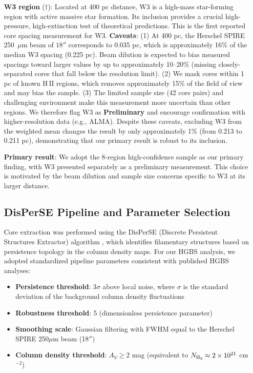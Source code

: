 \documentclass[11pt,a4paper]{article}
\begin{document}
\noindent\textbf{W3 region} ($\dagger$): Located at 400 pc distance, W3 is a high-mass star-forming region with active massive star formation. Its inclusion provides a crucial high-pressure, high-extinction test of theoretical predictions. This is the first reported core spacing measurement for W3. \textbf{Caveats}: (1) At 400 pc, the Herschel SPIRE 250~$\mu$m beam of $18''$ corresponds to 0.035 pc, which is approximately 16\% of the median W3 spacing (0.225 pc). Beam dilution is expected to bias measured spacings toward larger values by up to approximately 10--20\% (missing closely-separated cores that fall below the resolution limit). (2) We mask cores within 1 pc of known H\,{\scriptsize II} regions, which removes approximately 15\% of the field of view and may bias the sample. (3) The limited sample size (42 core pairs) and challenging environment make this measurement more uncertain than other regions. We therefore flag W3 as \textbf{Preliminary} and encourage confirmation with higher-resolution data (e.g., ALMA). Despite these caveats, excluding W3 from the weighted mean changes the result by only approximately 1\% (from 0.213 to 0.211 pc), demonstrating that our primary result is robust to its inclusion.

\textbf{Primary result}: We adopt the 8-region high-confidence sample as our primary finding, with W3 presented separately as a preliminary measurement. This choice is motivated by the beam dilution and sample size concerns specific to W3 at its larger distance.

\subsection{DisPerSE Pipeline and Parameter Selection}

Core extraction was performed using the DisPerSE (Discrete Persistent Structures Extractor) algorithm \citep{Sousbie2011}, which identifies filamentary structures based on persistence topology in the column density maps. For our HGBS analysis, we adopted standardized pipeline parameters consistent with published HGBS analyses:

\begin{itemize}
    \item \textbf{Persistence threshold}: $3\sigma$ above local noise, where $\sigma$ is the standard deviation of the background column density fluctuations
    \item \textbf{Robustness threshold}: 5 (dimensionless persistence parameter)
    \item \textbf{Smoothing scale}: Gaussian filtering with FWHM equal to the Herschel SPIRE 250$\mu$m beam (18$'')$
    \item \textbf{Column density threshold}: $A_V \geq 2$ mag (equivalent to $N_{\rm H_2} \approx 2 \times 10^{21}$ cm$^{-2}$)
\end{itemize}
\end{document}
